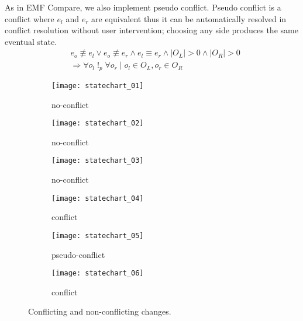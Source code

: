 As in EMF Compare, we also implement pseudo conflict. Pseudo conflict is a conflict where $e_{l}$ and $e_{r}$ are equivalent thus it can be automatically resolved in conflict resolution without user intervention; choosing any side produces the same eventual state.
\begin{equation} \label{eq:conflict_3.5}
\begin{split}
& e_{o} \not\equiv e_{l} \vee e_{o} \not\equiv e_{r} \wedge e_{l} \equiv e_{r} \wedge |O_{L}| > 0 \wedge |O_{R}| > 0\\
& \Rightarrow \forall o_{l} \;!_{p}\; \forall o_{r} \;|\; o_{l} \in O_{L}, o_{r} \in O_{R}
\end{split}
\end{equation} 


\begin{figure}
    \begin{subfigure}[t]{0.49\linewidth}
        \texttt{[image: statechart\_01]}
        \caption{no-conflict}
        \label{fig:statechart_01}
    \end{subfigure}
    \hfill
    \begin{subfigure}[t]{0.49\linewidth}
        \texttt{[image: statechart\_02]}
        \caption{no-conflict}
        \label{fig:statechart_02}
    \end{subfigure}
    \begin{subfigure}[t]{0.49\linewidth}
        \texttt{[image: statechart\_03]}
        \caption{no-conflict}
        \label{fig:statechart_03}
    \end{subfigure}
    \hfill
    \begin{subfigure}[t]{0.49\linewidth}
        \texttt{[image: statechart\_04]}
        \caption{conflict}
        \label{fig:statechart_04}
    \end{subfigure}
    \begin{subfigure}[t]{0.49\linewidth}
        \texttt{[image: statechart\_05]}
        \caption{pseudo-conflict}
        \label{fig:statechart_05}
    \end{subfigure}
    \hfill
    \begin{subfigure}[t]{0.49\linewidth}
        \texttt{[image: statechart\_06]}
        \caption{conflict}
        \label{fig:statechart_06}
    \end{subfigure}
    \caption{Conflicting and non-conflicting changes.}
    \label{fig:conflict_states}
\end{figure}




